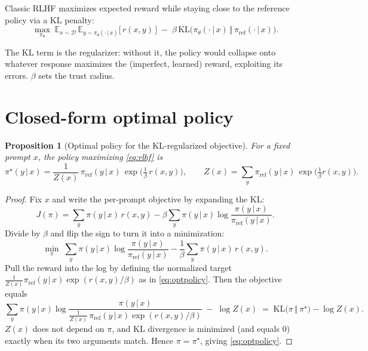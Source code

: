 \documentclass[11pt]{article}
\newcommand{\E}{\mathbb{E}}
\newcommand{\KL}{\mathrm{KL}}
\newcommand{\D}{\mathcal{D}}
\newcommand{\given}{\,\vert\,}
\newcommand{\pol}{\pi_{\theta}}          %
\newcommand{\piref}{\pi_{\mathrm{ref}}}  %
\newcommand{\polstar}{\pi^{\star}}       %
\newtheorem{proposition}{Proposition}
\begin{document}
Classic RLHF maximizes expected reward while staying close to the reference
policy via a KL penalty:
\begin{equation}
  \max_{\pol} \;
  \E_{x \sim \D} \,
  \E_{y \sim \pol(\cdot \given x)}
  \Big[\, r(x, y) \,\Big]
  \;-\;
  \beta \, \KL\!\big( \pol(\cdot \given x) \,\Vert\, \piref(\cdot \given x) \big).
  \label{eq:rlhf}
\end{equation}

The KL term is the regularizer: without it, the policy would collapse onto
whatever response maximizes the (imperfect, learned) reward, exploiting its
errors. $\beta$ sets the trust radius.

\section{Closed-form optimal policy}

\begin{proposition}[Optimal policy for the KL-regularized objective]
For a fixed prompt $x$, the policy maximizing \eqref{eq:rlhf} is
\begin{equation}
  \polstar(y \given x)
  = \frac{1}{Z(x)} \, \piref(y \given x) \,
    \exp\!\Big( \tfrac{1}{\beta} \, r(x, y) \Big),
  \qquad
  Z(x) = \sum_{y} \piref(y \given x) \, \exp\!\Big( \tfrac{1}{\beta} r(x, y) \Big).
  \label{eq:optpolicy}
\end{equation}
\end{proposition}

\begin{proof}
Fix $x$ and write the per-prompt objective by expanding the KL:
\[
  J(\pi)
  = \sum_{y} \pi(y \given x)\, r(x,y)
  - \beta \sum_{y} \pi(y \given x) \log \frac{\pi(y \given x)}{\piref(y \given x)}.
\]
Divide by $\beta$ and flip the sign to turn it into a minimization:
\[
  \min_{\pi} \;
  \sum_{y} \pi(y \given x)
  \log \frac{\pi(y \given x)}{\piref(y \given x)}
  - \frac{1}{\beta} \sum_{y} \pi(y \given x)\, r(x,y).
\]
Pull the reward into the log by defining the normalized target
$\tfrac{1}{Z(x)}\piref(y\given x)\exp(r(x,y)/\beta)$ as in \eqref{eq:optpolicy}.
Then the objective equals
\[
  \sum_y \pi(y\given x)
  \log \frac{\pi(y \given x)}
            {\tfrac{1}{Z(x)}\,\piref(y\given x)\exp(r(x,y)/\beta)}
  \;-\; \log Z(x)
  \;=\;
  \KL\!\big(\pi \,\Vert\, \polstar\big) - \log Z(x).
\]
$Z(x)$ does not depend on $\pi$, and KL divergence is minimized (and equals $0$)
exactly when its two arguments match. Hence $\pi = \polstar$, giving
\eqref{eq:optpolicy}.
\end{proof}
\end{document}
